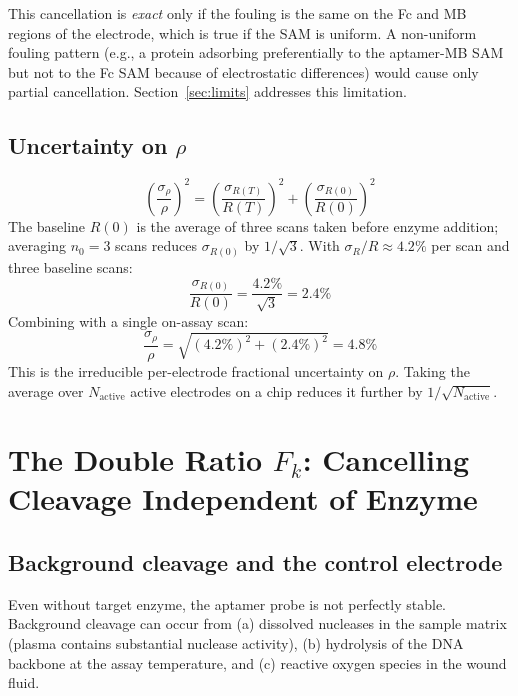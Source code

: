 \documentclass[10pt,a4paper]{article}
\numberwithin{equation}{section}
\begin{document}
This cancellation is \emph{exact} only if the fouling is the same on the Fc
and MB regions of the electrode, which is true if the SAM is uniform.
A non-uniform fouling pattern (e.g., a protein adsorbing preferentially
to the aptamer-MB SAM but not to the Fc SAM because of electrostatic
differences) would cause only partial cancellation. Section~\ref{sec:limits}
addresses this limitation.

\subsection{Uncertainty on $\rho$}

\begin{equation}
  \left(\frac{\sigma_\rho}{\rho}\right)^2 =
  \left(\frac{\sigma_{R(T)}}{R(T)}\right)^2 +
  \left(\frac{\sigma_{R(0)}}{R(0)}\right)^2
  \label{eq:sigrho}
\end{equation}
The baseline $R(0)$ is the average of three scans taken before enzyme
addition; averaging $n_0 = 3$ scans reduces $\sigma_{R(0)}$ by
$1/\sqrt{3}$. With $\sigma_R/R \approx 4.2\%$ per scan and three baseline
scans:
\begin{equation}
  \frac{\sigma_{R(0)}}{R(0)} = \frac{4.2\%}{\sqrt{3}} = 2.4\%
  \label{eq:sigrho0}
\end{equation}
Combining with a single on-assay scan:
\begin{equation}
  \frac{\sigma_\rho}{\rho} = \sqrt{(4.2\%)^2 + (2.4\%)^2} = 4.8\%
  \label{eq:sigrho_val}
\end{equation}
This is the irreducible per-electrode fractional uncertainty on $\rho$.
Taking the average over $N_\text{active}$ active electrodes on a chip
reduces it further by $1/\sqrt{N_\text{active}}$.

\section{The Double Ratio $F_k$: Cancelling Cleavage Independent of Enzyme}
\label{sec:Fk}

\subsection{Background cleavage and the control electrode}

Even without target enzyme, the aptamer probe is not perfectly stable.
Background cleavage can occur from (a) dissolved nucleases in the sample
matrix (plasma contains substantial nuclease activity), (b) hydrolysis of
the DNA backbone at the assay temperature, and (c) reactive oxygen species
in the wound fluid.
\end{document}
